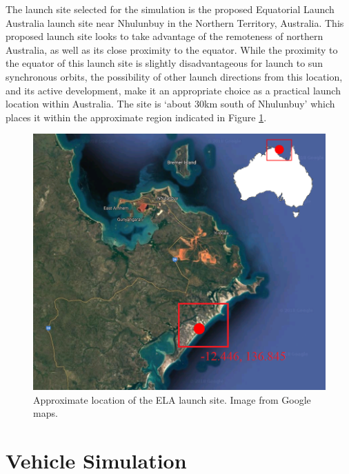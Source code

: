 The launch site selected for the simulation is the proposed Equatorial Launch Australia launch site near Nhulunbuy in the Northern Territory, Australia\cite{ELA}. This proposed launch site looks to take advantage of the remoteness of northern Australia, as well as its close proximity to the equator. While the proximity to the equator of this launch site is slightly disadvantageous for launch to sun synchronous orbits, the possibility of other launch directions from this location, and its active development, make it an appropriate choice as a practical launch location within Australia. The site is `about 30km south of Nhulunbuy'\cite{ELA} which places it within the approximate region indicated in Figure \ref{fig:SiteLocation}.

\begin{figure}[ht]
	\centering
	\includegraphics[width=0.7\linewidth]{figures/4_LODESTAR/SiteLocation}
	\caption{Approximate location of the ELA launch site. Image from Google maps.}
	\label{fig:SiteLocation}
\end{figure}


\section{Vehicle Simulation}

